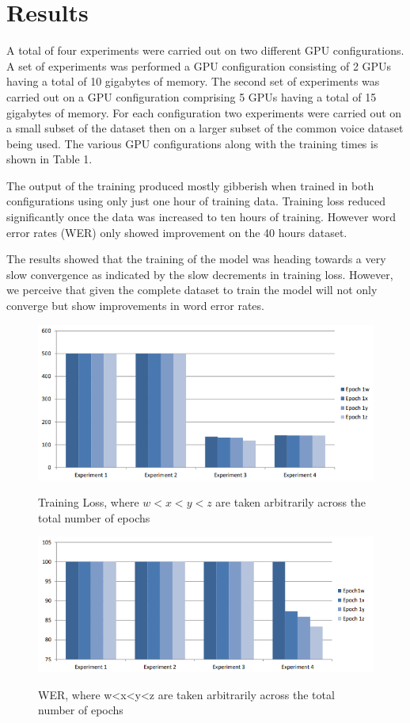 \section{Results}
A total of four experiments were carried out on two different GPU configurations. A set of experiments was performed a GPU configuration consisting of 2 GPUs having a total of 10 gigabytes of memory. The second set of experiments was carried out on a GPU configuration comprising 5 GPUs having a total of 15 gigabytes of memory.  For each configuration two experiments were carried out on a small subset of the dataset then on a larger subset of the common voice dataset being used.   The various GPU configurations along with the training times is shown in Table 1.

The output of the training produced mostly gibberish when trained in both configurations using only just one hour of training data.  Training loss reduced significantly once the data was increased to ten hours of training.  However word error rates (WER) only showed improvement on the 40 hours dataset.

The results showed that the training of the model was heading towards a very slow convergence as indicated by the slow decrements in training loss.  However, we perceive that given the complete dataset to train the model will not only converge but show improvements in word error rates.
\begin{figure}
\centering
  \includegraphics[width=14cm]{thesis/images/res00.PNG}\\
  \caption{Training Loss, where $w<x<y<z$ are taken arbitrarily across the
total number of epochs} \label{fig_6_2_loss}
\end{figure}
\begin{figure}
\centering
  \includegraphics[width=14cm]{thesis/images/res01.PNG}\\
  \caption{WER, where w<x<y<z are taken arbitrarily across the total
number of epochs} \label{fig_6_3_wer}
\end{figure}

